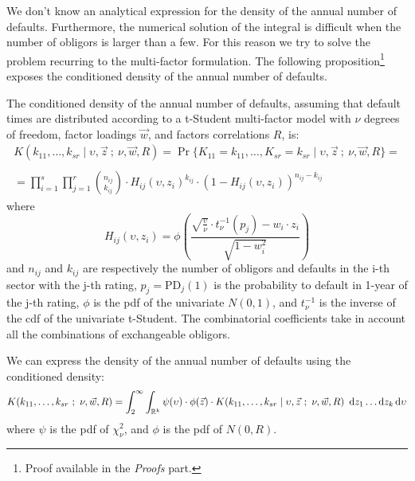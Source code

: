 \documentclass[11pt,fleqn]{book} %
\begin{document}
We don't know an analytical expression for the density of the annual number 
of defaults. Furthermore, the numerical solution of the integral is difficult 
when the number of obligors is larger than a few. For this reason we try to 
solve the problem recurring to the multi-factor formulation. The following
proposition\footnote{Proof available in the \emph{Proofs} part.} exposes the
conditioned density of the annual number of defaults.

\begin{proposition}
	\label{prop:cdand}
	The conditioned density of the annual number of defaults, assuming 
	that default times are distributed according to a t-Student multi-factor 
	model with $\nu$ degrees of freedom, factor loadings $\vec{w}$, and 
	factors correlations $R$, is:
	\begin{displaymath}
		\begin{array}{l}
			K(k_{11},\dots,k_{sr} \mid \upsilon,\vec{z}\ ;\ \nu,\vec{w}, R) = 
			\Pr\{K_{11}=k_{11},\dots,K_{sr}=k_{sr} \mid \upsilon,\vec{z}\ ;\ \nu, \vec{w}, R\} = \\
			\\
			= \displaystyle \prod_{i=1}^s \prod_{j=1}^r \binom{n_{ij}}{k_{ij}} \cdot
			H_{ij}(\upsilon,z_i)^{k_{ij}} \cdot
			\left( 1 - H_{ij}(\upsilon,z_i) \right)^{n_{ij}-k_{ij}}
		\end{array}
	\end{displaymath}
	where
	\begin{displaymath}
		H_{ij}(\upsilon,z_i) = \phi\left(  
		\frac{\sqrt{\frac{\upsilon}{\nu}} \cdot t_{\nu}^{-1}(p_j) - w_i\cdot z_i}{\sqrt{1-w_i^2}}
		\right)
	\end{displaymath}
	and $n_{ij}$ and $k_{ij}$ are respectively the number of obligors and 
	defaults in the i-th sector with the j-th rating, $p_j = \text{PD}_j(1)$ 
	is the probability to default in 1-year of the j-th rating,
	$\phi$ is the pdf of the univariate $N(0,1)$, and $t_{\nu}^{-1}$ is the 
	inverse of the cdf of the univariate t-Student. The combinatorial coefficients 
	take in account all the combinations of exchangeable obligors.
\end{proposition}

\begin{corollary}
	We can express the density of the annual number of defaults using 
	the conditioned density:
	\begin{displaymath}
			K(k_{11},\dots,k_{sr}\ ;\ \nu, \vec{w}, R) = %
			\displaystyle \int_2^{\infty} \int_{\mathbb{R}^k}
			\psi(\upsilon) \cdot \phi(\vec{z}) \cdot
			K(k_{11},\dots,k_{sr} \mid \upsilon,\vec{z}\ ;\ \nu,\vec{w}, R) 
			\ \ud z_1 \dots \ud z_k \ud \upsilon
	\end{displaymath}
	where $\psi$ is the pdf of $\chi_{\nu}^2$, and $\phi$ is the pdf of $N(0,R)$.
\end{corollary}
\end{document}
